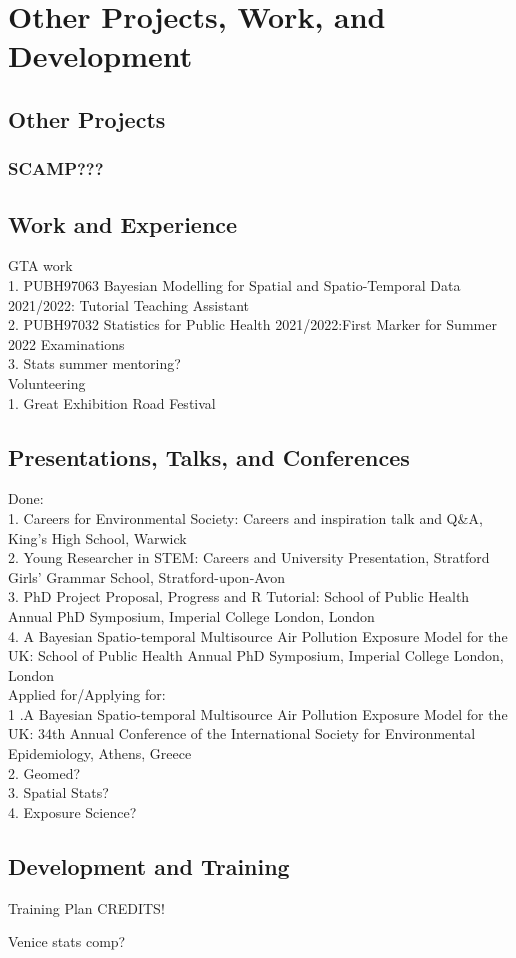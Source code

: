 \chapter{Other Projects, Work, and Development}

\section{Other Projects}
\subsection{SCAMP???}

\section{Work and Experience}
GTA work \\
1. PUBH97063 Bayesian Modelling for Spatial and Spatio-Temporal Data 2021/2022: Tutorial Teaching Assistant \\
2. PUBH97032 Statistics for Public Health 2021/2022:First Marker for Summer 2022 Examinations \\
3. Stats summer mentoring? \\

Volunteering\\
1. Great Exhibition Road Festival 

\section{Presentations, Talks, and Conferences}
Done:\\
1. Careers for Environmental Society: Careers and inspiration talk and Q\&A, King's High School, Warwick\\
2. Young Researcher in STEM: Careers and University Presentation, Stratford Girls' Grammar School, Stratford-upon-Avon\\
3. PhD Project Proposal, Progress and R Tutorial: School of Public Health Annual PhD Symposium, Imperial College London, London\\
4. A Bayesian Spatio-temporal Multisource Air Pollution Exposure Model for the UK: School of Public Health Annual PhD Symposium, Imperial College London, London\\

Applied for/Applying for:\\
1 .A Bayesian Spatio-temporal Multisource Air Pollution Exposure Model for the UK: 34th Annual Conference of the International Society for Environmental Epidemiology, Athens, Greece\\
2. Geomed?\\
3. Spatial Stats?\\
4. Exposure Science?\\

\section{Development and Training} \label{Sec: Dev}
Training Plan
CREDITS!

Venice stats comp?
